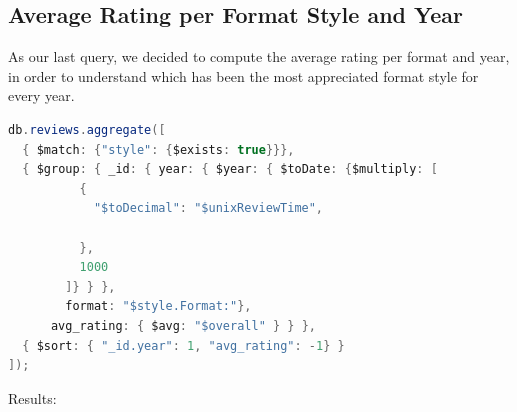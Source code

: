 \subsection{Average Rating per Format Style and Year}
As our last query, we decided to compute the average rating per format and year, in order to understand which has been the most appreciated format style for every year. \\
\begin{lstlisting}[language=Java]
db.reviews.aggregate([
  { $match: {"style": {$exists: true}}},
  { $group: { _id: { year: { $year: { $toDate: {$multiply: [
          {
            "$toDecimal": "$unixReviewTime",
            
          },
          1000
        ]} } }, 
        format: "$style.Format:"}, 
      avg_rating: { $avg: "$overall" } } },
  { $sort: { "_id.year": 1, "avg_rating": -1} }
]);
\end{lstlisting}
Results:
